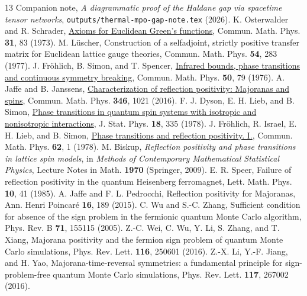 \documentclass[aps,prl,reprint,amsmath,amssymb,nofootinbib,raggedbottom]{revtex4-2}
\begin{document}
\begin{thebibliography}{13}
Companion note, \emph{A diagrammatic proof of the Haldane gap via spacetime
tensor networks}, \texttt{outputs/thermal-mpo-gap-note.tex} (2026).
K. Osterwalder and R. Schrader,
\href{https://doi.org/10.1007/BF01645738}{Axioms for Euclidean Green's
functions}, Commun. Math. Phys. \textbf{31}, 83 (1973).
M. L\"uscher, Construction of a selfadjoint, strictly positive transfer
matrix for Euclidean lattice gauge theories, Commun. Math. Phys.
\textbf{54}, 283 (1977).
J. Fr\"ohlich, B. Simon, and T. Spencer,
\href{https://doi.org/10.1007/BF01608557}{Infrared bounds, phase
transitions and continuous symmetry breaking}, Commun. Math. Phys.
\textbf{50}, 79 (1976).
A. Jaffe and B. Janssens,
\href{https://doi.org/10.1007/s00220-015-2545-z}{Characterization of
reflection positivity: Majoranas and spins}, Commun. Math. Phys.
\textbf{346}, 1021 (2016).
F. J. Dyson, E. H. Lieb, and B. Simon,
\href{https://doi.org/10.1007/BF01106729}{Phase transitions in quantum spin
systems with isotropic and nonisotropic interactions},
J. Stat. Phys. \textbf{18}, 335 (1978).
J. Fr\"ohlich, R. Israel, E. H. Lieb, and B. Simon,
\href{https://doi.org/10.1007/BF01940327}{Phase transitions and reflection
positivity. I.}, Commun. Math. Phys. \textbf{62}, 1 (1978).
M. Biskup, \emph{Reflection positivity and phase transitions in lattice spin
models}, in \emph{Methods of Contemporary Mathematical Statistical
Physics}, Lecture Notes in Math. \textbf{1970} (Springer, 2009).
E. R. Speer, Failure of reflection positivity in the quantum Heisenberg
ferromagnet, Lett. Math. Phys. \textbf{10}, 41 (1985).
A. Jaffe and F. L. Pedrocchi, Reflection positivity for Majoranas,
Ann. Henri Poincar\'e \textbf{16}, 189 (2015).
C. Wu and S.-C. Zhang, Sufficient condition for absence of the sign problem
in the fermionic quantum Monte Carlo algorithm, Phys. Rev. B \textbf{71},
155115 (2005).
Z.-C. Wei, C. Wu, Y. Li, S. Zhang, and T. Xiang, Majorana positivity and the
fermion sign problem of quantum Monte Carlo simulations,
Phys. Rev. Lett. \textbf{116}, 250601 (2016).
Z.-X. Li, Y.-F. Jiang, and H. Yao, Majorana-time-reversal symmetries: a
fundamental principle for sign-problem-free quantum Monte Carlo
simulations, Phys. Rev. Lett. \textbf{117}, 267002 (2016).
\end{thebibliography}
\end{document}
